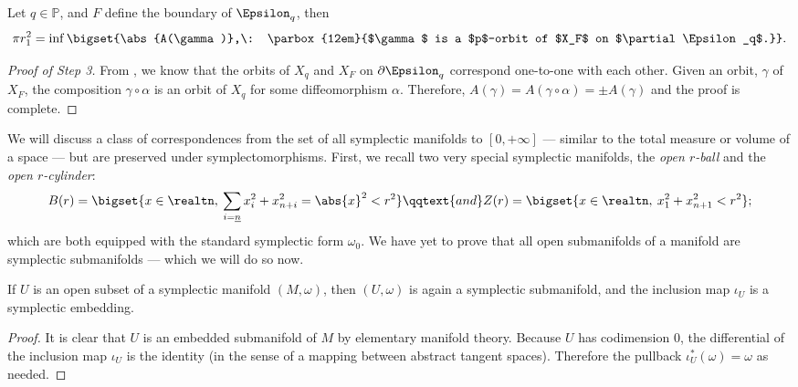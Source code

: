 \documentclass[../main-v2-manifolds.tex]{subfiles}
\begin{document}
\begin{step}
    Let $q\in\mathbb{P}$, and $F$ define the boundary of $\Epsilon_q$, then
    \[
        \pi r_1^2 = \inf\bigset{\abs{A(\gamma)},\: \parbox{12em}{$\gamma$ is a $p$-orbit of $X_F$ on $\partial \Epsilon_q$.}}.
    \]   
\end{step}
\begin{proof}[Proof of Step 3]
    From , we know that the orbits of $X_q$ and $X_F$ on $\partial \Epsilon_q$ correspond one-to-one with each other. Given an orbit, $\gamma$ of  $X_F$, the composition $\gamma\circ\alpha$ is an orbit of $X_q$ for some diffeomorphism $\alpha$. Therefore, $A(\gamma) = A(\gamma\circ\alpha) = \pm A(\gamma)$ and the proof is complete.
\end{proof}
\clearpage
\providecommand{\Grom}{\mathrm{Gromov}}
\providecommand{\Periodic}{\mathrm{Periodic}}
\providecommand{\frakc}{\mathcal{C}}
\providecommand{\frakco}{\mathcal{C}_0}
\providecommand{\hcal}{\mathcal{H}}
\providecommand{\hcala}{\mathcal{H}_a}
\providecommand{\osc}{\mathrm{osc}}
%
%
We will discuss a class of correspondences from the set of all symplectic manifolds to $[0,+\infty]$ --- similar to the total measure or volume of a space --- but are preserved under symplectomorphisms. First, we recall two very special symplectic manifolds, the \emph{open $r$-ball} and the \emph{open $r$-cylinder}:
\[
    B(r) = \bigset{x\in\realtn,\: \sum_{i=\underline{n}} x^2_{i} + x^2_{n+i}=\abs{x}^2<r^2}\qqtext{and}Z(r) = \bigset{x\in\realtn,\: x^2_1 + x^2_{n+1}<r^2};
\]
which are both equipped with the standard symplectic form $\omega_0$. We have yet to prove that all open submanifolds of a manifold are symplectic submanifolds --- which we will do so now.
\begin{wts}
    If $U$ is an open subset of a symplectic manifold $(M,\omega)$, then $(U,\omega)$ is again a symplectic submanifold, and the inclusion map $\iota_U$ is a symplectic embedding.
\end{wts}
\begin{proof}
    It is clear that $U$ is an embedded submanifold of $M$ by elementary manifold theory. Because $U$ has codimension $0$, the differential of the inclusion map $\iota_U$ is the identity (in the sense of a mapping between abstract tangent spaces). Therefore the pullback $\iota_U^*(\omega) = \omega$ as needed. 
\end{proof}
\end{document}
